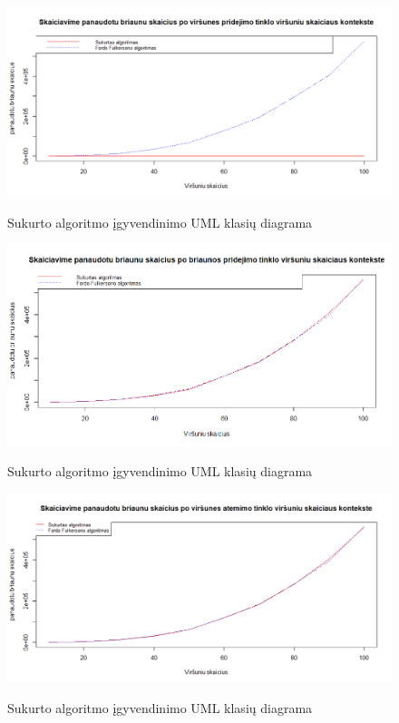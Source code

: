 \begin{figure}[H]
	\caption{Sukurto algoritmo įgyvendinimo UML klasių diagrama}
	\centering
	\includegraphics[width=\textwidth]{img/vav.png}
	\label{plot:vav}
\end{figure}
\begin{figure}[H]
	\caption{Sukurto algoritmo įgyvendinimo UML klasių diagrama}
	\centering
	\includegraphics[width=\textwidth]{img/vae.png}
	\label{plot:vae}
\end{figure}
\begin{figure}[H]
	\caption{Sukurto algoritmo įgyvendinimo UML klasių diagrama}
	\centering
	\includegraphics[width=\textwidth]{img/vrv.png}
	\label{plot:vrv}
\end{figure}
